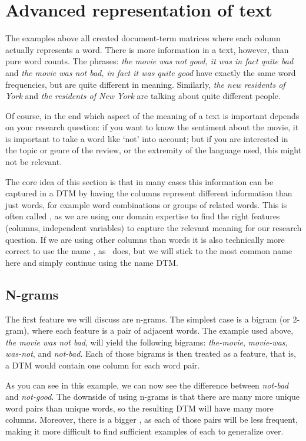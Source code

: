\section{Advanced representation of text}
\label{ngram}

The examples above all created document-term matrices where each column actually represents a word.
There is more information in a text, however, than pure word counts.
The phrases: \emph{the movie was not good, it was in fact quite bad} and \emph{the movie was not bad, in fact it was quite good}
have exactly the same word frequencies, but are quite different in meaning.
Similarly, \emph{the new residents of York} and \emph{the residents of New York} are talking about quite different people. 

Of course, in the end which aspect of the meaning of a text is important depends on your research question:
if you want to know the sentiment about the movie, it is important to take a word like `not' into account;
but if you are interested in the topic or genre of the review, or the extremity of the language used, this might not be relevant.

The core idea of this section is that in many cases this information can be captured in a DTM by having the columns represent different information than just words, for example word combinations or groups of related words.
This is often called , as we are using our domain expertise to find the right features (columns, independent variables) to capture the relevant meaning for our research question.
If we are using other columns than words it is also technically more correct to use the name , as \quanteda\ does, but we will stick to the most common name here and simply continue using the name DTM.

\subsection{N-grams}

The first feature we will discuss are n-grams.
The simplest case is a bigram (or 2-gram), where each feature is a pair of adjacent words.
The example used above, \emph{the movie was not bad}, will yield the following bigrams: \emph{the-movie}, \emph{movie-was}, \emph{was-not}, and \emph{not-bad}.
Each of those bigrams is then treated as a feature, that is, a DTM would contain one column for each word pair.

As you can see in this example, we can now see the difference between \emph{not-bad} and \emph{not-good}.
The downside of using n-grams is that there are many more unique word pairs than unique words,
so the resulting DTM will have many more columns.
Moreover, there is a bigger , as each of those pairs will be less frequent,
making it more difficult to find sufficient examples of each to generalize over.

